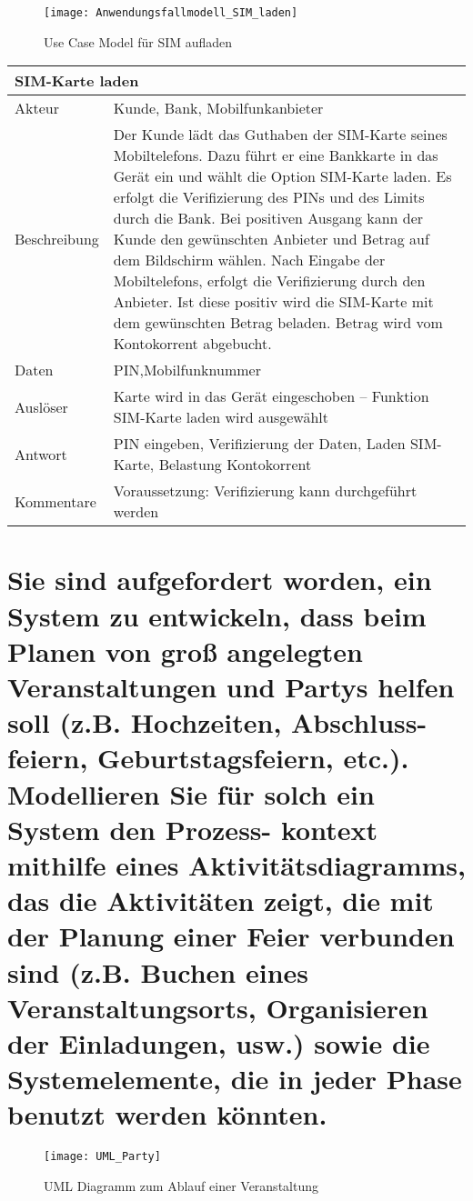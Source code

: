 \documentclass[12pt]{article}
\begin{document}
\pagebreak

\begin{figure}[h]
 \begin{center}
  \texttt{[image: Anwendungsfallmodell\_SIM\_laden]}
 \end{center}
 \caption{Use Case Model für SIM aufladen}
\end{figure}
\begin{tabular}{|p{3cm}|p{13cm}|}
 \hline
 \multicolumn{2}{|l|}{\textbf{SIM-Karte laden}} \\
 \hline
 Akteur&Kunde, Bank, Mobilfunkanbieter\\
 \hline
 Beschreibung&Der Kunde lädt das Guthaben der SIM-Karte seines Mobiltelefons. Dazu führt er eine Bankkarte in das Gerät ein und wählt die Option SIM-Karte laden. Es erfolgt die Verifizierung des PINs und des Limits durch die Bank. Bei positiven Ausgang kann der Kunde den gewünschten Anbieter und Betrag auf dem Bildschirm wählen. Nach Eingabe der Mobiltelefons, erfolgt die Verifizierung durch den Anbieter. Ist diese positiv wird die SIM-Karte mit dem gewünschten Betrag beladen. Betrag wird vom Kontokorrent abgebucht.\\
 \hline
 Daten&PIN,Mobilfunknummer\\
 \hline
 Auslöser&Karte wird in das Gerät eingeschoben – Funktion SIM-Karte laden wird ausgewählt\\
 \hline
 Antwort&PIN eingeben, Verifizierung der Daten, Laden SIM-Karte, Belastung Kontokorrent\\
 \hline
 Kommentare&Voraussetzung: Verifizierung kann durchgeführt werden\\
 \hline
\end{tabular}
\pagebreak
\section{Sie sind aufgefordert worden, ein System zu entwickeln, dass beim Planen von groß angelegten Veranstaltungen und Partys helfen soll (z.B. Hochzeiten, Abschluss- feiern, Geburtstagsfeiern, etc.). Modellieren
Sie für solch ein System den Prozess- kontext mithilfe eines Aktivitätsdiagramms, das die Aktivitäten zeigt,
die mit der Planung einer Feier verbunden sind (z.B. Buchen eines Veranstaltungsorts, Organisieren der
Einladungen, usw.) sowie die Systemelemente, die in jeder Phase benutzt werden könnten.}
\begin{figure}[h]
\begin{center}
\texttt{[image: UML\_Party]}
\caption{UML Diagramm zum Ablauf einer Veranstaltung}
\end{center}
\end{figure}
\pagebreak
\end{document}
